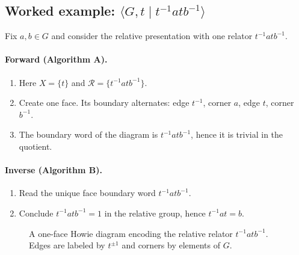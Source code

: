 \documentclass[11pt]{article}
\theoremstyle{definition}
\theoremstyle{plain}
\theoremstyle{remark}
\begin{document}
\subsection*{Worked example: $\langle G,t \mid t^{-1} a t b^{-1}\rangle$}
Fix $a,b\in G$ and consider the relative presentation with one relator $t^{-1} a t b^{-1}$.

\paragraph{Forward (Algorithm A).}
\begin{enumerate}[leftmargin=2.2em]
\item Here $X=\{t\}$ and $\mathcal R=\{t^{-1} a t b^{-1}\}$.
\item Create one face. Its boundary alternates:
edge $t^{-1}$, corner $a$, edge $t$, corner $b^{-1}$.
\item The boundary word of the diagram is $t^{-1} a t b^{-1}$, hence it is trivial in the quotient.
\end{enumerate}

\paragraph{Inverse (Algorithm B).}
\begin{enumerate}[leftmargin=2.2em]
\item Read the unique face boundary word $t^{-1} a t b^{-1}$.
\item Conclude $t^{-1} a t b^{-1}=1$ in the relative group, hence $t^{-1} a t=b$.
\end{enumerate}

\begin{figure}[h]
\centering
{}
\caption{A one-face Howie diagram encoding the relative relator $t^{-1} a t b^{-1}$. Edges are labeled by $t^{\pm1}$ and corners by elements of $G$.}
\end{figure}

\end{document}
